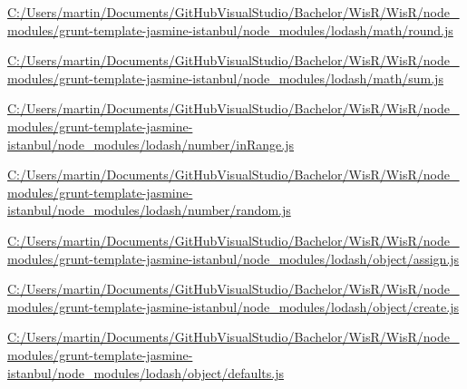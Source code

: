 \begin{DoxyCompactItemize}
\item 
\hyperlink{_c_1_2_users_2martin_2_documents_2_git_hub_visual_studio_2_bachelor_2_wis_r_2_wis_r_2node_moduleda8e8958b61b7f4e97461dc6fd21700d}{C\+:/\+Users/martin/\+Documents/\+Git\+Hub\+Visual\+Studio/\+Bachelor/\+Wis\+R/\+Wis\+R/node\+\_\+modules/grunt-\/template-\/jasmine-\/istanbul/node\+\_\+modules/lodash/math/round.\+js}
\item 
\hyperlink{_c_1_2_users_2martin_2_documents_2_git_hub_visual_studio_2_bachelor_2_wis_r_2_wis_r_2node_module99a0b6c9c6af1395ddf70e42e7e6c872}{C\+:/\+Users/martin/\+Documents/\+Git\+Hub\+Visual\+Studio/\+Bachelor/\+Wis\+R/\+Wis\+R/node\+\_\+modules/grunt-\/template-\/jasmine-\/istanbul/node\+\_\+modules/lodash/math/sum.\+js}
\item 
\hyperlink{_c_1_2_users_2martin_2_documents_2_git_hub_visual_studio_2_bachelor_2_wis_r_2_wis_r_2node_module84204292335ee661378a8223fdda174d}{C\+:/\+Users/martin/\+Documents/\+Git\+Hub\+Visual\+Studio/\+Bachelor/\+Wis\+R/\+Wis\+R/node\+\_\+modules/grunt-\/template-\/jasmine-\/istanbul/node\+\_\+modules/lodash/number/in\+Range.\+js}
\item 
\hyperlink{_c_1_2_users_2martin_2_documents_2_git_hub_visual_studio_2_bachelor_2_wis_r_2_wis_r_2node_module198fce3c192c675a0799b77d321a5efd}{C\+:/\+Users/martin/\+Documents/\+Git\+Hub\+Visual\+Studio/\+Bachelor/\+Wis\+R/\+Wis\+R/node\+\_\+modules/grunt-\/template-\/jasmine-\/istanbul/node\+\_\+modules/lodash/number/random.\+js}
\item 
\hyperlink{_c_1_2_users_2martin_2_documents_2_git_hub_visual_studio_2_bachelor_2_wis_r_2_wis_r_2node_module36fe1d61e52ad0448f9b525f6a9946d1}{C\+:/\+Users/martin/\+Documents/\+Git\+Hub\+Visual\+Studio/\+Bachelor/\+Wis\+R/\+Wis\+R/node\+\_\+modules/grunt-\/template-\/jasmine-\/istanbul/node\+\_\+modules/lodash/object/assign.\+js}
\item 
\hyperlink{_c_1_2_users_2martin_2_documents_2_git_hub_visual_studio_2_bachelor_2_wis_r_2_wis_r_2node_module8530bcdbfdcea7fa7daf496663a07f53}{C\+:/\+Users/martin/\+Documents/\+Git\+Hub\+Visual\+Studio/\+Bachelor/\+Wis\+R/\+Wis\+R/node\+\_\+modules/grunt-\/template-\/jasmine-\/istanbul/node\+\_\+modules/lodash/object/create.\+js}
\item 
\hyperlink{_c_1_2_users_2martin_2_documents_2_git_hub_visual_studio_2_bachelor_2_wis_r_2_wis_r_2node_modulee17b77f24eb8135be0e1c4702780150b}{C\+:/\+Users/martin/\+Documents/\+Git\+Hub\+Visual\+Studio/\+Bachelor/\+Wis\+R/\+Wis\+R/node\+\_\+modules/grunt-\/template-\/jasmine-\/istanbul/node\+\_\+modules/lodash/object/defaults.\+js}

\end{DoxyCompactItemize}
